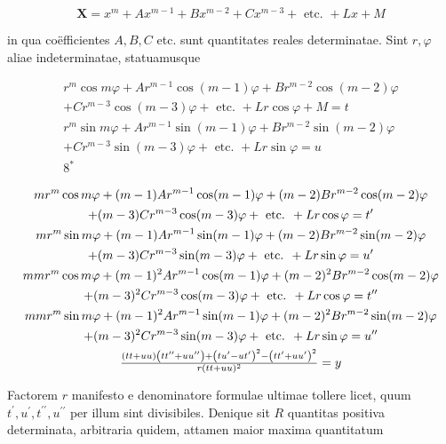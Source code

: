 \documentclass[twoside,12pt, showframe]{memoir}
\let\oldfrac\frac
\def\frac#1#2{\mathchoice{\tfrac{#1}{#2}}{\oldfrac{#1}{#2}}{\genfrac{}{}{}{2}{#1}{#2\mathstrut}}{\genfrac{}{}{}{3}{#1}{#2\mathstrut}}}
\begin{document}
\[
\mathbf{X}=x^{m}+A x^{m-1}+B x^{m-2}+C x^{m-3}+\text { etc. }+L x+M
\]

in qua coëfficientes \(A, B, C\) etc. sunt quantitates reales determinatae. Sint \(r, \varphi\) aliae indeterminatae, statuamusque

\[
\begin{gathered}
r^{m} \cos m \varphi+A r^{m-1} \cos (m-1) \varphi+B r^{m-2} \cos (m-2) \varphi \\
+C r^{m-3} \cos (m-3) \varphi+\text { etc. }+L r \cos \varphi+M=t \\
r^{m} \sin m \varphi+A r^{m-1} \sin (m-1) \varphi+B r^{m-2} \sin (m-2) \varphi \\
+C r^{m-3} \sin (m-3) \varphi+\text { etc. }+L r \sin \varphi=u \\
8^{*}
\end{gathered}
\]

\[
\begin{gathered}
m r^{m} \cos m \varphi+(m-1) A r^{m-1} \cos (m-1) \varphi+(m-2) B r^{m-2} \cos (m-2) \varphi \\
+(m-3) C r^{m-3} \cos (m-3) \varphi+\text { etc. }+L r \cos \varphi=t^{\prime} \\
m r^{m} \sin m \varphi+(m-1) A r^{m-1} \sin (m-1) \varphi+(m-2) B r^{m-2} \sin (m-2) \varphi \\
+(m-3) C r^{m-3} \sin (m-3) \varphi+\text { etc. }+L r \sin \varphi=u^{\prime} \\
m m r^{m} \cos m \varphi+(m-1)^{2} A r^{m-1} \cos (m-1) \varphi+(m-2)^{2} B r^{m-2} \cos (m-2) \varphi \\
+(m-3)^{2} C r^{m-3} \cos (m-3) \varphi+\text { etc. }+L r \cos \varphi=t^{\prime \prime} \\
m m r^{m} \sin m \varphi+(m-1)^{2} A r^{m-1} \sin (m-1) \varphi+(m-2)^{2} B r^{m-2} \sin (m-2) \varphi \\
+(m-3)^{2} C r^{m-3} \sin (m-3) \varphi+\text { etc. }+L r \sin \varphi=u^{\prime \prime} \\
\frac{(t t+u u)\left(t t^{\prime \prime}+u u^{\prime \prime}\right)+\left(t u^{\prime}-u t^{\prime}\right)^{2}-\left(t t^{\prime}+u u^{\prime}\right)^{2}}{r(t t+u u)^{2}}=y
\end{gathered}
\]

Factorem \(r\) manifesto e denominatore formulae ultimae tollere licet, quum \(t^{\prime}, u^{\prime}, t^{\prime \prime}, u^{\prime \prime}\) per illum sint divisibiles. Denique sit \(R\) quantitas positiva determinata, arbitraria quidem, attamen maior maxima quantitatum
\end{document}
